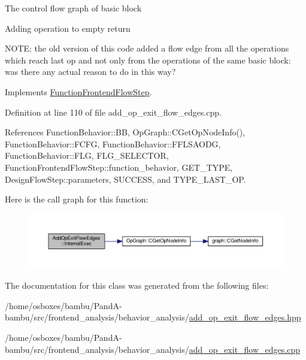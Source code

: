 The control flow graph of basic block

Adding operation to empty return

N\+O\+TE\+: the old version of this code added a flow edge from all the operations which reach last op and not only from the operations of the same basic block\+: was there any actual reason to do in this way? 

Implements \hyperlink{classFunctionFrontendFlowStep_a00612f7fb9eabbbc8ee7e39d34e5ac68}{Function\+Frontend\+Flow\+Step}.



Definition at line 110 of file add\+\_\+op\+\_\+exit\+\_\+flow\+\_\+edges.\+cpp.



References Function\+Behavior\+::\+BB, Op\+Graph\+::\+C\+Get\+Op\+Node\+Info(), Function\+Behavior\+::\+F\+C\+FG, Function\+Behavior\+::\+F\+F\+L\+S\+A\+O\+DG, Function\+Behavior\+::\+F\+LG, F\+L\+G\+\_\+\+S\+E\+L\+E\+C\+T\+OR, Function\+Frontend\+Flow\+Step\+::function\+\_\+behavior, G\+E\+T\+\_\+\+T\+Y\+PE, Design\+Flow\+Step\+::parameters, S\+U\+C\+C\+E\+SS, and T\+Y\+P\+E\+\_\+\+L\+A\+S\+T\+\_\+\+OP.

Here is the call graph for this function\+:
\nopagebreak
\begin{figure}[H]
\begin{center}
\leavevmode
\includegraphics[width=350pt]{dd/d49/classAddOpExitFlowEdges_a2fff48c7aee4af42bd8b509af08c40e5_cgraph}
\end{center}
\end{figure}


The documentation for this class was generated from the following files\+:\begin{DoxyCompactItemize}
\item 
/home/osboxes/bambu/\+Pand\+A-\/bambu/src/frontend\+\_\+analysis/behavior\+\_\+analysis/\hyperlink{add__op__exit__flow__edges_8hpp}{add\+\_\+op\+\_\+exit\+\_\+flow\+\_\+edges.\+hpp}\item 
/home/osboxes/bambu/\+Pand\+A-\/bambu/src/frontend\+\_\+analysis/behavior\+\_\+analysis/\hyperlink{add__op__exit__flow__edges_8cpp}{add\+\_\+op\+\_\+exit\+\_\+flow\+\_\+edges.\+cpp}\end{DoxyCompactItemize}
